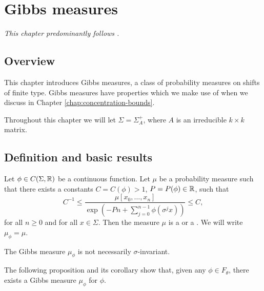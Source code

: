 \chapter{Gibbs measures}
\emph{This chapter predominantly follows \cite[Chapter 3]{parry-pollicott:zeta-fns-periodic-orbits}.}

\section{Overview}
This chapter introduces Gibbs measures, a class of probability measures on shifts of finite type. Gibbs measures have properties which we make use of when we discuss \cite{chazottes-maldonado:cbfee} in Chapter \ref{chap:concentration-bounds}.

Throughout this chapter we will let $\Sigma = \Sigma_A^+$, where $A$ is an irreducible $k \times k$ matrix.

\section{Definition and basic results}

\begin{definition}
	Let $\phi \in C(\Sigma, \mathbb{R})$ be a continuous function. Let $\mu$ be a probability measure such that there exists a constants $C = C(\phi) > 1$, $P = P(\phi) \in \mathbb{R}$, such that
	\begin{equation}
		C^{-1} \leq \frac{\mu[x_0, \dots, x_n]}{\exp\left(-Pn + \sum_{j = 0}^{n - 1}{\phi(\sigma^j{x})} \right)} \leq C,
	\end{equation}
	for all $n \geq 0$ and for all $x \in \Sigma$. Then the measure $\mu$ is a  or a . We will write $\mu_\phi = \mu$.
\end{definition}

\begin{remark}
	The Gibbs measure $\mu_\phi$ is not necessarily $\sigma$-invariant.
\end{remark}

The following proposition and its corollary show that, given any $\phi \in F_\theta$, there exists a Gibbs measure $\mu_\phi$ for $\phi$.

